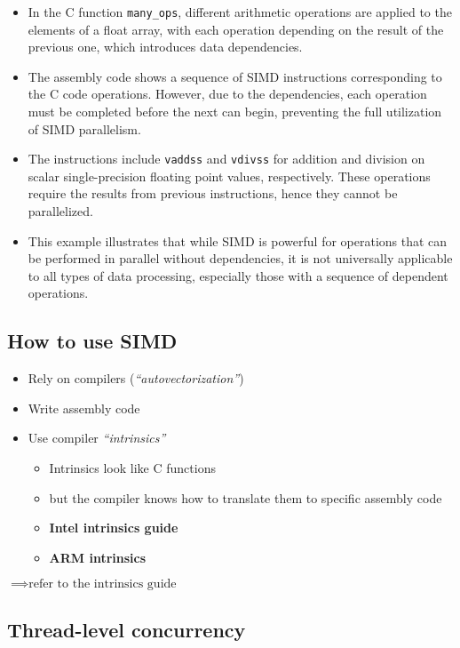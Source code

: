 \documentclass[12pt]{article}
\begin{document}
\begin{itemize}
    \item In the C function \texttt{many\_ops}, different arithmetic operations are applied to the elements of a float array, with each operation depending on the result of the previous one, which introduces data dependencies.
    \item The assembly code shows a sequence of SIMD instructions corresponding to the C code operations. However, due to the dependencies, each operation must be completed before the next can begin, preventing the full utilization of SIMD parallelism.
    \item The instructions include \texttt{vaddss} and \texttt{vdivss} for addition and division on scalar single-precision floating point values, respectively. These operations require the results from previous instructions, hence they cannot be parallelized.
    \item This example illustrates that while SIMD is powerful for operations that can be performed in parallel without dependencies, it is not universally applicable to all types of data processing, especially those with a sequence of dependent operations.
\end{itemize}

\subsection{How to use SIMD}
\begin{itemize}
    \item Rely on compilers (\textit{``autovectorization''})
    \item Write assembly code
    \item Use compiler \textit{``intrinsics''}
    \begin{itemize}
        \item Intrinsics look like C functions
        \item but the compiler knows how to translate them to specific assembly code
        \item \textbf{Intel intrinsics guide}
        \item \textbf{ARM intrinsics}
    \end{itemize}
\end{itemize}

$\implies \text{refer to the intrinsics guide}$
\subsection{Thread-level concurrency}
\end{document}
